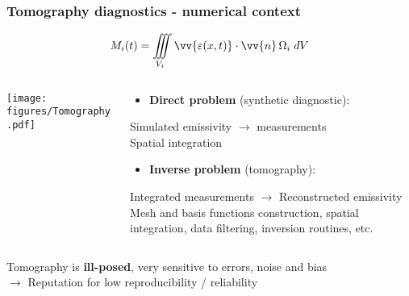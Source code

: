 \documentclass[10pt]{beamer}
\begin{document}
\begin{frame}
\frametitle{Tomography diagnostics - numerical context}

    $$M_i(t) = \iiint\limits_{V_i} \vv{\varepsilon(x,t)}\cdot\vv{n} \,\Omega_i \;{d}V$$
    \vspace{-1cm}
\begin{columns}
    	\begin{column}{0.325\textwidth}
    	
    	\texttt{[image: figures/Tomography.pdf]}

    	\end{column}

   	\begin{column}{0.675\textwidth}
   	\begin{center}
   	
   	\begin{block}{}
	\begin{itemize}
	\item \textcolor{myblue}{\textbf{Direct problem} (synthetic diagnostic):\\
	}
	\end{itemize}
	\end{block}
Simulated emissivity $\longrightarrow$ measurements\\
	\alert{Spatial integration}
    \vspace{-0.5cm}

   	\begin{block}{}
	\begin{itemize}
	\item \textcolor{myblue}{\textbf{Inverse problem} (tomography):\\
	}
	\end{itemize}
	\end{block}
Integrated measurements $\longrightarrow$ Reconstructed emissivity \\
	 \alert{Mesh and basis functions construction, spatial integration, data filtering, inversion routines, etc.}
   	
   	\end{center}
	
   	\end{column}
%    	
\end{columns}

\pause
\vspace{-0.5cm}
\begin{block}{}
\begin{center}
Tomography is \textbf{ill-posed}, very sensitive to errors, noise and bias\\
$\longrightarrow$  \alert{Reputation for low reproducibility / reliability }
\end{center}
	\end{block}
\end{frame}
\end{document}
